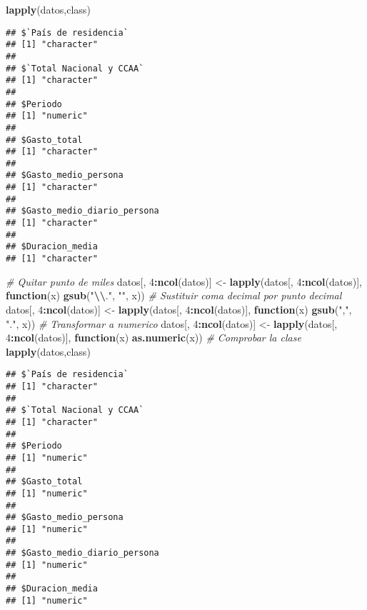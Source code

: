 \documentclass[notspecified,article,submit,moreauthors,pdftex]{Definitions/mdpi}
\newenvironment{Shaded}{\begin{snugshade}}{\end{snugshade}}
\newcommand{\CommentTok}[1]{\textcolor[rgb]{0.56,0.35,0.01}{\textit{#1}}}
\newcommand{\ControlFlowTok}[1]{\textcolor[rgb]{0.13,0.29,0.53}{\textbf{#1}}}
\newcommand{\DecValTok}[1]{\textcolor[rgb]{0.00,0.00,0.81}{#1}}
\newcommand{\FunctionTok}[1]{\textcolor[rgb]{0.13,0.29,0.53}{\textbf{#1}}}
\newcommand{\NormalTok}[1]{#1}
\newcommand{\OtherTok}[1]{\textcolor[rgb]{0.56,0.35,0.01}{#1}}
\newcommand{\SpecialCharTok}[1]{\textcolor[rgb]{0.81,0.36,0.00}{\textbf{#1}}}
\newcommand{\StringTok}[1]{\textcolor[rgb]{0.31,0.60,0.02}{#1}}
\begin{document}
\begin{Shaded}
\begin{Highlighting}[]
\FunctionTok{lapply}\NormalTok{(datos,class)}
\end{Highlighting}
\end{Shaded}

\begin{verbatim}
## $`País de residencia`
## [1] "character"
## 
## $`Total Nacional y CCAA`
## [1] "character"
## 
## $Periodo
## [1] "numeric"
## 
## $Gasto_total
## [1] "character"
## 
## $Gasto_medio_persona
## [1] "character"
## 
## $Gasto_medio_diario_persona
## [1] "character"
## 
## $Duracion_media
## [1] "character"
\end{verbatim}

\begin{Shaded}
\begin{Highlighting}[]
\CommentTok{\# Quitar punto de miles}
\NormalTok{datos[, }\DecValTok{4}\SpecialCharTok{:}\FunctionTok{ncol}\NormalTok{(datos)] }\OtherTok{\textless{}{-}} \FunctionTok{lapply}\NormalTok{(datos[, }\DecValTok{4}\SpecialCharTok{:}\FunctionTok{ncol}\NormalTok{(datos)], }\ControlFlowTok{function}\NormalTok{(x) }\FunctionTok{gsub}\NormalTok{(}\StringTok{"}\SpecialCharTok{\textbackslash{}\textbackslash{}}\StringTok{."}\NormalTok{, }\StringTok{""}\NormalTok{, x))}
\CommentTok{\# Sustituir coma decimal por punto decimal}
\NormalTok{datos[, }\DecValTok{4}\SpecialCharTok{:}\FunctionTok{ncol}\NormalTok{(datos)] }\OtherTok{\textless{}{-}} \FunctionTok{lapply}\NormalTok{(datos[, }\DecValTok{4}\SpecialCharTok{:}\FunctionTok{ncol}\NormalTok{(datos)], }\ControlFlowTok{function}\NormalTok{(x) }\FunctionTok{gsub}\NormalTok{(}\StringTok{","}\NormalTok{, }\StringTok{"."}\NormalTok{, x))}
\CommentTok{\# Transformar a numerico}
\NormalTok{datos[, }\DecValTok{4}\SpecialCharTok{:}\FunctionTok{ncol}\NormalTok{(datos)] }\OtherTok{\textless{}{-}} \FunctionTok{lapply}\NormalTok{(datos[, }\DecValTok{4}\SpecialCharTok{:}\FunctionTok{ncol}\NormalTok{(datos)], }\ControlFlowTok{function}\NormalTok{(x) }\FunctionTok{as.numeric}\NormalTok{(x))}
\CommentTok{\# Comprobar la clase}
\FunctionTok{lapply}\NormalTok{(datos,class)}
\end{Highlighting}
\end{Shaded}

\begin{verbatim}
## $`País de residencia`
## [1] "character"
## 
## $`Total Nacional y CCAA`
## [1] "character"
## 
## $Periodo
## [1] "numeric"
## 
## $Gasto_total
## [1] "numeric"
## 
## $Gasto_medio_persona
## [1] "numeric"
## 
## $Gasto_medio_diario_persona
## [1] "numeric"
## 
## $Duracion_media
## [1] "numeric"
\end{verbatim}
\end{document}
